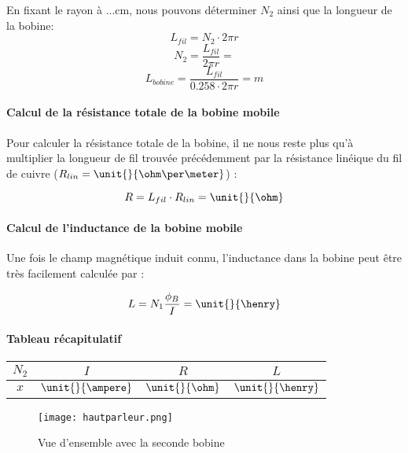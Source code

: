 En fixant le rayon à ...cm, nous pouvons déterminer $N_2$ ainsi que la longueur de la bobine:
$$L_{fil} = N_2 \cdot 2\pi r$$ 
$$N_2 =  \frac{L_{fil}}{2\pi r} = $$
$$L_{bobine} = \frac{L_{fil}}{0.258 \cdot 2\pi r} = m$$



\paragraph{Calcul de la résistance totale de la bobine mobile}
Pour calculer la résistance totale de la bobine, il ne nous reste plus qu'à multiplier la longueur de fil trouvée 
précédemment par la résistance linéique du fil de cuivre
($R_{lin} = \unit{}{\ohm\per\meter}$) :

$$R = L_{fil} \cdot R_{lin} = \unit{}{\ohm}$$

\paragraph{Calcul de l'inductance de la bobine mobile}

Une fois le champ magnétique induit connu, l'inductance dans la bobine peut être très facilement calculée par :

$$L = N_1 \frac{\phi_B}{I} = \unit{}{\henry}$$

\paragraph{Tableau récapitulatif}

\begin{center}
	\begin{tabular}{c|c|c|c}
		$N_2$ & $I$ & $R$ & $L$ \\
		\hline
		 $x$ & $\unit{}{\ampere}$ & $\unit{}{\ohm}$ & $\unit{}{\henry}$ \\
	\end{tabular}
\end{center}

\begin{figure}[h]
\centering
\texttt{[image: hautparleur.png]}
\caption{Vue d'ensemble avec la seconde bobine}
\label{Vue d'ensemble avec la seconde bobine}
\end{figure}


